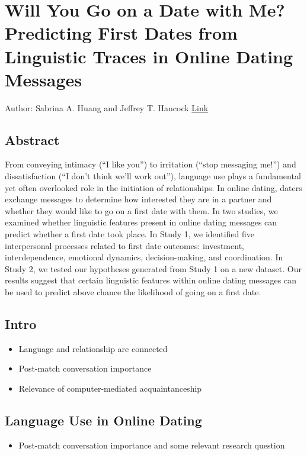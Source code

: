     
    
    
    
\section{Will You Go on a Date with Me? Predicting First Dates from Linguistic Traces in Online Dating Messages}
Author: Sabrina A. Huang and Jeffrey T. Hancock 
\href{https://journals.sagepub.com/doi/10.1177/0261927X211066612}{Link}

\subsection{Abstract}
From conveying intimacy (“I like you”) to irritation (“stop messaging me!”) and dissatisfaction (“I don’t think we’ll work out”), language use plays a fundamental yet often overlooked role in the initiation of relationships. In online dating, daters exchange messages to determine how interested they are in a partner and whether they would like to go on a first date with them. In two studies, we examined whether linguistic features present in online dating messages can predict whether a first date took place. In Study 1, we identified five interpersonal processes related to first date outcomes: investment, interdependence, emotional dynamics, decision-making, and coordination. In Study 2, we tested our hypotheses generated from Study 1 on a new dataset. Our results suggest that certain linguistic features within online dating messages can be used to predict above chance the likelihood of going on a first date.

\subsection{Intro}
\begin{itemize}
    \item Language and relationship are connected 
    \item Post-match conversation importance 
    \item Relevance of computer-mediated acquaintanceship 
\end{itemize}

\subsection{Language Use in Online Dating} 
\begin{itemize}
    \item Post-match conversation importance and some relevant research question
\end{itemize}

